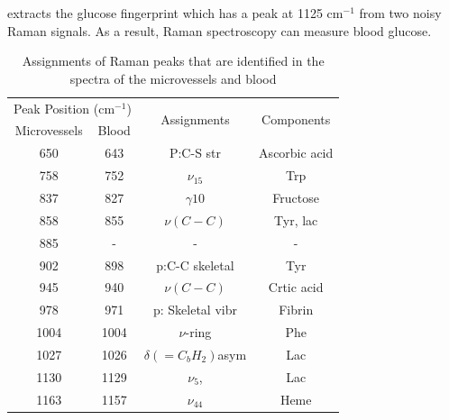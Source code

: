 \cite{directGlucose} extracts the glucose fingerprint which has a peak at 1125 $\text{cm}^{-1}$ from two noisy Raman signals.
As a result, Raman spectroscopy can measure blood glucose.



\begin{table}[]
\caption{Assignments of Raman peaks that are identified in the spectra of the microvessels and blood \citep{peak45,forearm2005,peak47,peak48}}
\begin{center}
\begin{tabular}{cccc}
\hline
\multicolumn{2}{l}{Peak Position ($\text{cm}^{-1}$)} & \multirow{2}{*}{Assignments}  & \multirow{2}{*}{Components} \\ \cline{1-2}
Microvessels         & Blood         &                               &                             \\ \cline{1-2}
\hline
650                  & 643           & P:C-S str                     & Ascorbic acid               \\
758                  & 752           & $\nu_{15}$                    & Trp                         \\
837                  & 827           & $\gamma10$                    & Fructose                    \\
858                  & 855           & $\nu(C-C)$                    & Tyr, lac                    \\
885                  & -             & -                             & -                           \\
902                  & 898           & p:C-C skeletal                & Tyr                         \\
945                  & 940           & $\nu(C-C)$                    & Crtic acid                  \\
978                  & 971           & p: Skeletal vibr              & Fibrin                      \\
1004                 & 1004          & $\nu$-ring                    & Phe                         \\
1027                 & 1026          & $\delta(={C}_{b}{H}_{2})$asym & Lac                         \\
1130                 & 1129          & $\nu_5$,                      & Lac                         \\
1163                 & 1157          & $\nu_{44}$                    & Heme                        \\

\end{tabular}
\end{center}
\end{table}
